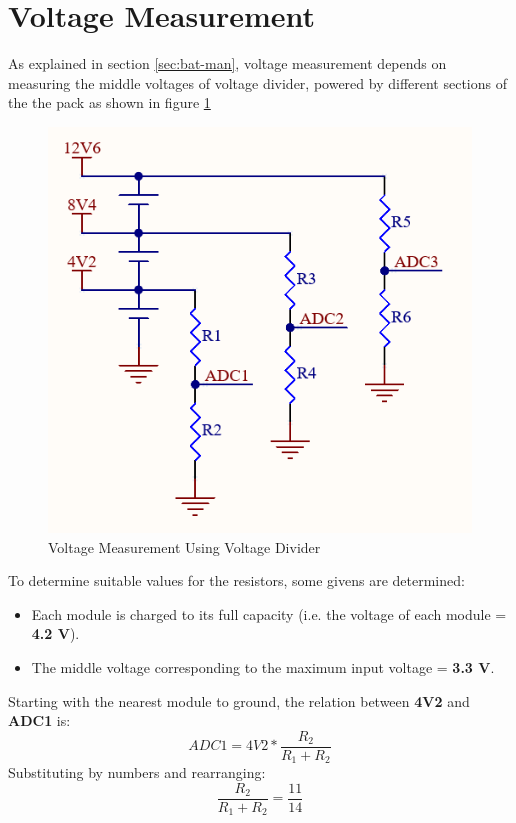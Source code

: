 \section{Voltage Measurement}
As explained in section \ref{sec:bat-man}, voltage measurement depends on measuring the middle voltages of voltage divider, powered by different sections of the the pack as shown in figure \ref{fig:hw-volt-mes-apenC}

\begin{figure}[h!]
	\centering
	\includegraphics[scale=0.5]{./Figures/HW/Voltage-Measurement.png}
	\caption{Voltage Measurement Using Voltage Divider}
	\label{fig:hw-volt-mes-apenC}
\end{figure}

To determine suitable values for the resistors, some givens are determined:
\begin{itemize}
	\item Each module is charged to its full capacity (i.e. the voltage of each module = \textbf{4.2 V}).
	\item The middle voltage corresponding to the maximum input voltage = \textbf{3.3 V}.
\end{itemize}
Starting with the nearest module to ground, the relation between \textbf{4V2} and \textbf{ADC1} is:
\begin{equation}
	ADC1 = 4V2*\frac{R_2}{R_1 + R_2}
\end{equation}
Substituting by numbers and rearranging:
\begin{equation}
	\frac{R_2}{R_1 + R_2} = \frac{11}{14} 
\end{equation}

